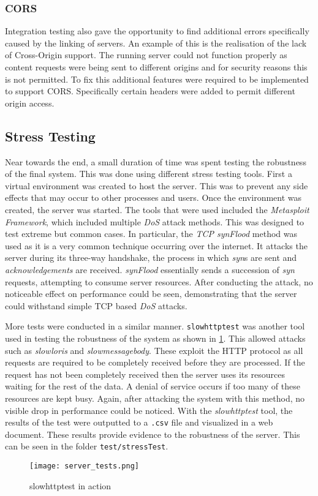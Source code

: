 \subsubsection{CORS}
Integration testing also gave the opportunity to find additional errors specifically caused by the linking of servers. An example of this is the realisation of the lack of Cross-Origin support. The running server could not function properly as content requests were being sent to different origins and for security reasons this is not permitted. To fix this additional features were required to be implemented to support CORS. Specifically certain headers were added to permit different origin access.
\subsection{Stress Testing}
Near towards the end, a small duration of time was spent testing the robustness of the final system. This was done using different stress testing tools. First a virtual environment was created to host the server. This was to prevent any side effects that may occur to other processes and users. Once the environment was created, the server was started. The tools that were used included the \textit{Metasploit Framework}, which included multiple \textit{DoS} attack methods. This was designed to test extreme but common cases. In particular, the \textit{TCP synFlood} method was used as it is a very common technique occurring over the internet. It attacks the server during its three-way handshake, the process in which \textit{syn}s are sent and \textit{acknowledgements} are received. \textit{synFlood} essentially sends a succession of \textit{syn} requests, attempting to consume server resources. After conducting the attack, no noticeable effect on performance could be seen, demonstrating that the server could withstand simple TCP based \textit{DoS} attacks.

More tests were conducted in a similar manner. \texttt{slowhttptest} was another tool used in testing the robustness of the system as shown in \ref{fig:stress}. This allowed attacks such as \textit{slowloris} and \textit{slowmessagebody}. These exploit the HTTP protocol as all requests are required to be completely received before they are processed. If the request has not been completely received then the server uses its resources waiting for the rest of the data. A denial of service occurs if too many of these resources are kept busy. Again, after attacking the system with this method, no visible drop in performance could be noticed. With the \textit{slowhttptest} tool, the results of the test were outputted to a \texttt{.csv} file and visualized in a web document. These results provide evidence to the robustness of the server. This can be seen in the folder \texttt{test/stressTest}.

\begin{figure}[H]
	\texttt{[image: server\_tests.png]}
	\centering
	\caption{slowhttptest in action}
	\label{fig:stress}
\end{figure}
